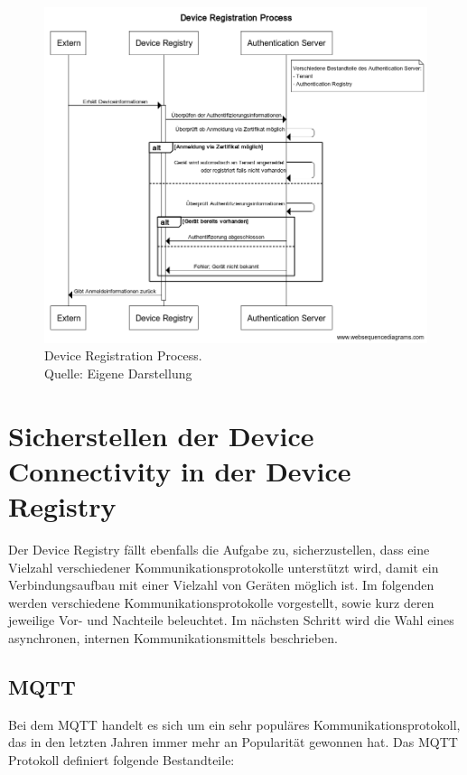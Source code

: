 \begin{figure}
    \centering
    \includegraphics[width=0.8\linewidth]{img/device_registration.png}
    \caption[Device Registration Process]{Device Registration Process.\\Quelle: Eigene Darstellung}
    \label{fig:dev_reg_proc}
\end{figure}

\clearpage
\section{Sicherstellen der Device Connectivity in der Device Registry}

Der Device Registry fällt ebenfalls die Aufgabe zu, sicherzustellen, dass eine Vielzahl verschiedener Kommunikationsprotokolle unterstützt wird, damit ein Verbindungsaufbau mit einer Vielzahl von Geräten möglich ist. Im folgenden werden verschiedene Kommunikationsprotokolle vorgestellt, sowie kurz deren jeweilige Vor- und Nachteile beleuchtet. Im nächsten Schritt wird die Wahl eines asynchronen, internen Kommunikationsmittels beschrieben.

\subsection{MQTT}
Bei dem \ac{MQTT} handelt es sich um ein sehr populäres Kommunikationsprotokoll, das in den letzten Jahren immer mehr an Popularität gewonnen hat. Das \ac{MQTT} Protokoll definiert folgende Bestandteile:

